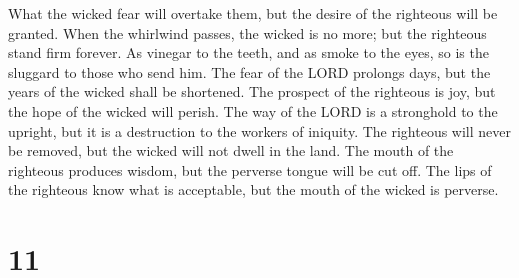  What the wicked fear will overtake them, but the desire
of the righteous will be granted.  When the whirlwind
passes, the wicked is no more; but the righteous stand firm forever.
 As vinegar to the teeth, and as smoke to the eyes, so is
the sluggard to those who send him.  The fear of the LORD
prolongs days, but the years of the wicked shall be shortened.
 The prospect of the righteous is joy, but the hope of
the wicked will perish.  The way of the LORD is a
stronghold to the upright, but it is a destruction to the workers of
iniquity.  The righteous will never be removed, but the
wicked will not dwell in the land.  The mouth of the
righteous produces wisdom, but the perverse tongue will be cut off.
 The lips of the righteous know what is acceptable, but
the mouth of the wicked is perverse.

\hypertarget{section-10}{%
\section{11}\label{section-10}}

